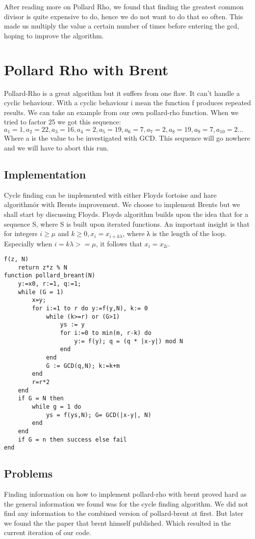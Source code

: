 \documentclass[a4paper, 12pt]{report}
\begin{document}
After reading more on Pollard Rho, we found that finding the greatest common divisor is quite expensive to do, hence we do not want to do that so often. This made us multiply the value a certain number of times before entering the gcd, hoping to improve the algorithm.

\section{Pollard Rho with Brent}
Pollard-Rho is a great algorithm but it suffers from one flaw. It can't handle a cyclic behaviour. With a cyclic behaviour i mean the function f produces repeated results. We can take an example from our own pollard-rho function. When we tried to factor 25 we got this sequence:
$a_1=1, a_2=22, a_3=16, a_4=2, a_5=19, a_6=7, a_7=2, a_8=19, a_9=7, a_10=2 ...$
Where a is the value to be investigated with GCD. This sequence will go nowhere and we will have to abort this run.

\subsection{Implementation}
Cycle finding can be implemented with either Floyds \"tortoise and hare algorithm\" or with Brents improvement. We choose to implement Brents but we shall start by discussing Floyds. Floyds algorithm builds upon the idea that for a sequence S, where S is built upon iterated functions. An important insight is that for integers $i ≥ μ$ and $k ≥ 0, x_i = x_{i + kλ}$, where λ is the length of the loop. Especially when $i = kλ >= μ$, it follows that $x_i = x_{2i}$.

\begin{lstlisting}
f(z, N)
	return z*z % N
function pollard_breant(N)
	y:=x0, r:=1, q:=1;
	while (G = 1)
		x=y;
		for i:=1 to r do y:=f(y,N), k:= 0
			while (k>=r) or (G>1)
				ys := y
				for i:=0 to min(m, r-k) do
					y:= f(y); q = (q * |x-y|) mod N
				end
			end
			G := GCD(q,N); k:=k+m
		end
		r=r*2
	end
	if G = N then
		while g = 1 do
			ys = f(ys,N); G= GCD(|x-y|, N)
		end
	end
	if G = n then success else fail
end
\end{lstlisting}
\subsection{Problems}
Finding information on how to implement pollard-rho with brent proved hard as the general information we found was for the cycle finding algorithm. We did not find any information to the combined version of pollard-brent at first. But later we found the the paper that brent himself published. Which resulted in the current iteration of our code.
\end{document}
